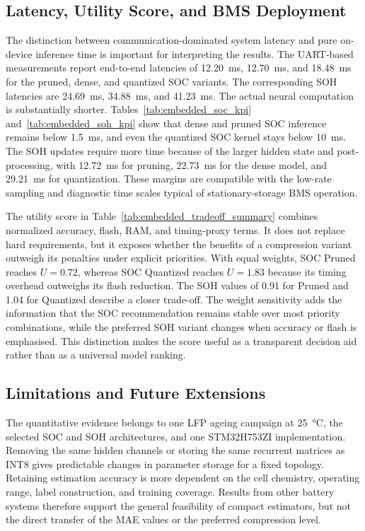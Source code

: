 \documentclass[
    a4paper,
    12pt,
    titlepage,
    bibliography=totoc,
    twoside=on,
    parskip=false,
    numbers=noenddot,
    cleardoublepage=empty,
    DIV=12,
    BCOR=12.0mm,
    headheight=36pt,
    headings=openright
]{scrreprt}
\begin{document}
\subsection{Latency, Utility Score, and BMS Deployment}
The distinction between communication-dominated system latency and pure on-device inference time is important for interpreting the results. The UART-based measurements report end-to-end latencies of \SI{12.20}{\milli\second}, \SI{12.70}{\milli\second}, and \SI{18.48}{\milli\second} for the pruned, dense, and quantized SOC variants. The corresponding SOH latencies are \SI{24.69}{\milli\second}, \SI{34.88}{\milli\second}, and \SI{41.23}{\milli\second}. The actual neural computation is substantially shorter. Tables~\ref{tab:embedded_soc_kpi} and~\ref{tab:embedded_soh_kpi} show that dense and pruned SOC inference remains below \SI{1.5}{\milli\second}, and even the quantized SOC kernel stays below \SI{10}{\milli\second}. The SOH updates require more time because of the larger hidden state and post-processing, with \SI{12.72}{\milli\second} for pruning, \SI{22.73}{\milli\second} for the dense model, and \SI{29.21}{\milli\second} for quantization. These margins are compatible with the low-rate sampling and diagnostic time scales typical of stationary-storage BMS operation.\autocite{plettBatteryManagementSystems2015,berecibarCriticalReviewState2016}

The utility score in Table~\ref{tab:embedded_tradeoff_summary} combines normalized accuracy, flash, RAM, and timing-proxy terms. It does not replace hard requirements, but it exposes whether the benefits of a compression variant outweigh its penalties under explicit priorities. With equal weights, SOC Pruned reaches $U=0.72$, whereas SOC Quantized reaches $U=1.83$ because its timing overhead outweighs its flash reduction. The SOH values of 0.91 for Pruned and 1.04 for Quantized describe a closer trade-off. The weight sensitivity adds the information that the SOC recommendation remains stable over most priority combinations, while the preferred SOH variant changes when accuracy or flash is emphasised. This distinction makes the score useful as a transparent decision aid rather than as a universal model ranking.

\subsection{Limitations and Future Extensions}
The quantitative evidence belongs to one LFP ageing campaign at \SI{25}{\degreeCelsius}, the selected SOC and SOH architectures, and one STM32H753ZI implementation. Removing the same hidden channels or storing the same recurrent matrices as INT8 gives predictable changes in parameter storage for a fixed topology. Retaining estimation accuracy is more dependent on the cell chemistry, operating range, label construction, and training coverage. Results from other battery systems therefore support the general feasibility of compact estimators, but not the direct transfer of the MAE values or the preferred compression level.\autocite{giazitzisCaseStudyTiny2024,liOnlineCapacityEstimation2021,rzepkaNeuralNetworkArchitecture2023a}
\end{document}
